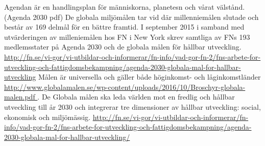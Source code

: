 \documentclass{report}
\begin{document}
Agendan är en handlingsplan för människorna, planetesn och vårat välstånd.
 (Agenda 2030 pdf) De globala miljömålen tar vid där millenniemålen slutade och består av 169 delmål för en bättre framtid. I september 2015 i samband med utvärderingen av milleniemålen hos FN i New York skrev samtliga av FNs 193 medlemsstater på Agenda 2030 och de globala målen för hållbar utveckling. \url{ http://fn.se/vi-gor/vi-utbildar-och-informerar/fn-info/vad-gor-fn-2/fns-arbete-for-utveckling-och-fattigdomsbekampning/agenda-2030-globala-mal-for-hallbar-utveckling} Målen är universella och gäller både höginkomst- och låginkomstländer \url{http://www.globalamalen.se/wp-content/uploads/2016/10/Broschyr-globala-malen.pdf }. De Globala målen ska leda världen mot en fredlig och hållbar utveckling till år 2030 och integrerar tre dimensioner av hållbar utveckling: social, ekonomisk och miljömässig.  \url{http://fn.se/vi-gor/vi-utbildar-och-informerar/fn-info/vad-gor-fn-2/fns-arbete-for-utveckling-och-fattigdomsbekampning/agenda-2030-globala-mal-for-hallbar-utveckling/}
 
\end{document}
